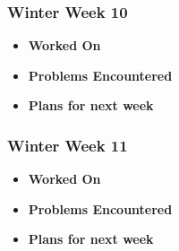 \documentclass[compsoc,draftclsnofoot,onecolumn,10pt]{IEEEtran}
\begin{document}
\subsubsection{Winter Week 10}
\begin{itemize}
    \item {\textbf{Worked On}}
    \begin{itemize}

    \end{itemize}

    \item {\textbf{Problems Encountered}}
    \begin{itemize}

    \end{itemize}

    \item{\textbf{Plans for next week}}
    \begin{itemize}

    \end{itemize}

\end{itemize}

\subsubsection{Winter Week 11}
\begin{itemize}
    \item {\textbf{Worked On}}
    \begin{itemize}

    \end{itemize}

    \item {\textbf{Problems Encountered}}
    \begin{itemize}

    \end{itemize}

    \item{\textbf{Plans for next week}}
    \begin{itemize}

    \end{itemize}

\end{itemize}
\end{document}
